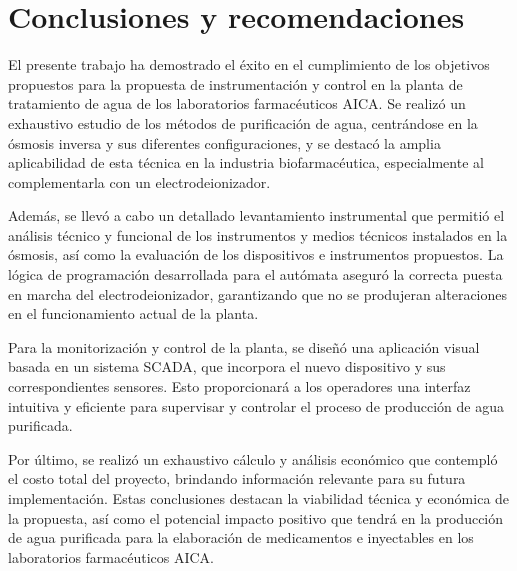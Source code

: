 \chapter*{Conclusiones y recomendaciones}
{}
El presente trabajo ha demostrado el éxito en el cumplimiento de los objetivos propuestos para la propuesta de instrumentación y control en la planta de tratamiento de agua de los laboratorios farmacéuticos AICA. Se realizó un exhaustivo estudio de los métodos de purificación de agua, centrándose en la ósmosis inversa y sus diferentes configuraciones, y se destacó la amplia aplicabilidad de esta técnica en la industria biofarmacéutica, especialmente al complementarla con un electrodeionizador.

Además, se llevó a cabo un detallado levantamiento instrumental que permitió el análisis técnico y funcional de los instrumentos y medios técnicos instalados en la ósmosis, así como la evaluación de los dispositivos e instrumentos propuestos. La lógica de programación desarrollada para el autómata aseguró la correcta puesta en marcha del electrodeionizador, garantizando que no se produjeran alteraciones en el funcionamiento actual de la planta.

Para la monitorización y control de la planta, se diseñó una aplicación visual basada en un sistema SCADA, que incorpora el nuevo dispositivo y sus correspondientes sensores. Esto proporcionará a los operadores una interfaz intuitiva y eficiente para supervisar y controlar el proceso de producción de agua purificada.

Por último, se realizó un exhaustivo cálculo y análisis económico que contempló el costo total del proyecto, brindando información relevante para su futura implementación. Estas conclusiones destacan la viabilidad técnica y económica de la propuesta, así como el potencial impacto positivo que tendrá en la producción de agua purificada para la elaboración de medicamentos e inyectables en los laboratorios farmacéuticos AICA.




